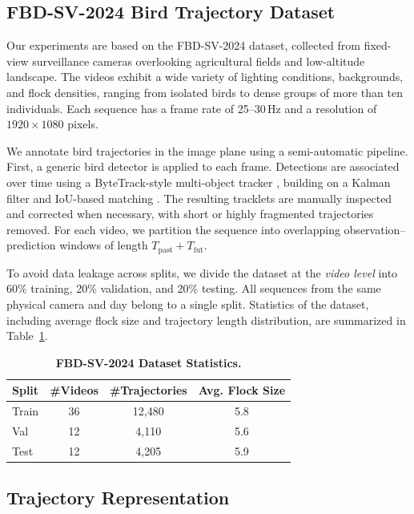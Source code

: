 \documentclass[journal]{IEEEtran}
\begin{document}
\subsection{FBD-SV-2024 Bird Trajectory Dataset}

Our experiments are based on the FBD-SV-2024 dataset, collected from fixed-view surveillance cameras overlooking agricultural fields and low-altitude landscape. The videos exhibit a wide variety of lighting conditions, backgrounds, and flock densities, ranging from isolated birds to dense groups of more than ten individuals. Each sequence has a frame rate of 25--30\,Hz and a resolution of $1920 \times 1080$ pixels.

We annotate bird trajectories in the image plane using a semi-automatic pipeline. First, a generic bird detector is applied to each frame. Detections are associated over time using a ByteTrack-style multi-object tracker \cite{Zhang2021ByteTrack}, building on a Kalman filter and IoU-based matching \cite{Bewley2016SORT}. The resulting tracklets are manually inspected and corrected when necessary, with short or highly fragmented trajectories removed. For each video, we partition the sequence into overlapping observation--prediction windows of length $T_{\text{past}} + T_{\text{fut}}$.

To avoid data leakage across splits, we divide the dataset at the \emph{video level} into 60\% training, 20\% validation, and 20\% testing. All sequences from the same physical camera and day belong to a single split. Statistics of the dataset, including average flock size and trajectory length distribution, are summarized in Table~\ref{tab:dataset_stats}.

\begin{table}[t]
	\centering
	\caption{\textbf{FBD-SV-2024 Dataset Statistics.}}
	\label{tab:dataset_stats}
	\begin{tabular}{lccc}
		\toprule
		Split & \#Videos & \#Trajectories & Avg. Flock Size \\
		\midrule
		Train & 36 & 12{,}480 & 5.8 \\
		Val   & 12 & 4{,}110  & 5.6 \\
		Test  & 12 & 4{,}205  & 5.9 \\
		\bottomrule
	\end{tabular}
\end{table}

\subsection{Trajectory Representation}
\end{document}
